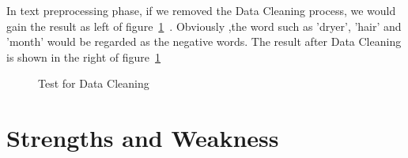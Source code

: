 \documentclass[12pt]{article}%
\begin{document}
In text preprocessing phase, if we removed the Data Cleaning process, we would gain the result as left of figure~\ref{fizzy}~. Obviously ,the word such as 'dryer', 'hair' and 'month' would be regarded as the negative words. The result after Data Cleaning is shown in the right of figure~\ref{fizzy}~
\begin{figure}[H]
	\centering
	\caption{Test for Data Cleaning}
	\label{fizzy}
\end{figure}






\section{Strengths and Weakness}
\end{document}
